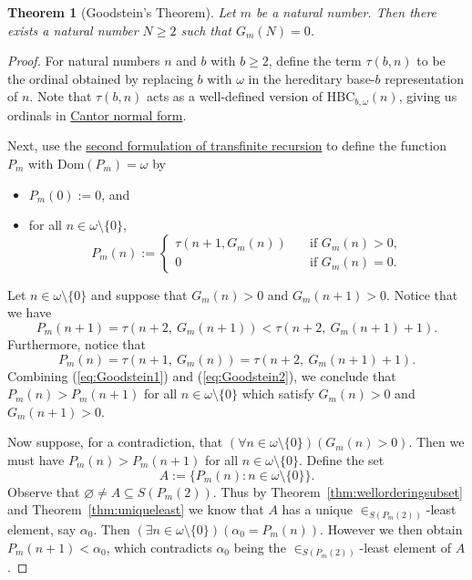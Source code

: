 \documentclass[a4paper,11pt]{article}
\theoremstyle{plain}
\newtheorem{thm}{Theorem}[subsection]
\theoremstyle{definition}
\theoremstyle{remark}
\begin{document}
\begin{thm}[Goodstein's Theorem]
Let $m$ be a natural number. Then there exists a natural number $N \geq 2$ such that $G_m(N) = 0$.
\end{thm}
\begin{proof}
For natural numbers $n$ and $b$ with $b \geq 2$, define the term $\tau(b, n)$ to be the ordinal obtained by replacing $b$ with $\omega$ in the hereditary base-$b$ representation of $n$. Note that $\tau(b,n)$ acts as a well-defined version of $\mathrm{HBC}_{b, \omega}(n)$, giving us ordinals in \hyperref[thm:CantorNormalForm]{Cantor normal form}.

Next, use the \hyperref[thm:Trecursion2]{second formulation of transfinite recursion} to define the function $P_m$ with $\mathrm{Dom}(P_m) = \omega$ by
\begin{itemize}
\item $P_m(0) := 0$, and
\item for all $n \in \omega\setminus\{0\}$, 
\[
P_m(n) := 
\begin{cases}
\tau(n+1, G_m(n)) &\quad \text{if } G_m(n) > 0, \\
0 &\quad\text{if } G_m(n) = 0.
\end{cases}
\]
\end{itemize}
Let $n \in \omega\setminus\{0\}$ and suppose that $G_m(n) > 0$ and $G_m(n+1) > 0$. Notice that we have
\setcounter{equation}{0}
\begin{equation}
\label{eq:Goodstein1}
P_m(n+1) = \tau(n+2,\ G_m(n+1)) < \tau(n+2,\ G_m(n+1) + 1).
\end{equation}
Furthermore, notice that
\begin{equation}
\label{eq:Goodstein2}
P_m(n) = \tau(n+1,\ G_m(n)) = \tau(n+2,\ G_m(n+1) + 1).
\end{equation}
Combining (\ref{eq:Goodstein1}) and (\ref{eq:Goodstein2}), we conclude that $P_m(n) > P_m(n+1)$ for all $n \in \omega\setminus\{0\}$ which satisfy $G_m(n) > 0$ and $G_m(n+1)>0$.

Now suppose, for a contradiction, that $(\forall n \in \omega\setminus\{0\})(G_m(n) > 0)$. Then we must have $P_m(n) > P_m(n+1)$ for all $n \in \omega\setminus\{0\}$. Define the set
\[A := \{P_m(n) : n\in\omega\setminus\{0\}\}.\]
Observe that $\varnothing \neq A \subseteq S(P_m(2))$. Thus by Theorem~\ref{thm:wellorderingsubset} and Theorem~\ref{thm:uniqueleast} we know that $A$ has a unique $\in_{S(P_m(2))}$-least element, say $\alpha_0$. Then $(\exists n\in\omega\setminus\{0\})(\alpha_0 = P_m(n))$. However we then obtain $P_m(n+1) < \alpha_0$, which contradicts $\alpha_0$ being the $\in_{S(P_m(2))}$-least element of $A$.
\end{proof}

\pagebreak

\end{document}
